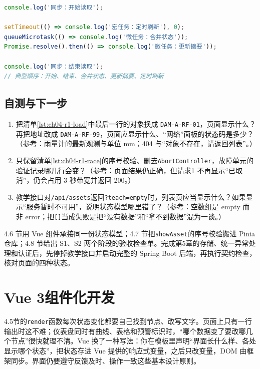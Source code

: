 \begin{lstlisting}[label={lst:ch04-a45-event-loop},language=JavaScript,caption={事件循环中的同步、微任务与宏任务}]
console.log('同步：开始读取');

setTimeout(() => console.log('宏任务：定时刷新'), 0);
queueMicrotask(() => console.log('微任务：合并状态'));
Promise.resolve().then(() => console.log('微任务：更新摘要'));

console.log('同步：结束读取');
// 典型顺序：开始、结束、合并状态、更新摘要、定时刷新
\end{lstlisting}

\subsection{自测与下一步}

\begin{enumerate}
\item 把清单\ref{lst:ch04-r1-load}中最后一行的对象换成 \texttt{DAM-A-RF-01}，页面显示什么？再把地址改成 \texttt{DAM-A-RF-99}，页面应显示什么、“网络”面板的状态码是多少？（参考：雨量计的最新观测与单位 mm；404 与“对象不存在，请返回列表”。）
\item 只保留清单\ref{lst:ch04-r1-race}的序号校验、删去\texttt{AbortController}，故障单元的验证记录哪几行会变？（参考：页面结果仍正确，但请求1 不再显示“已取消”，仍会占用 3 秒带宽并返回 200。）
\item 教学接口对\texttt{/api/assets}返回\texttt{?teach=empty}时，列表页应当显示什么？如果显示“服务暂时不可用”，说明状态模型哪里错了？（参考：空数组是 empty 而非 error；把\texttt{[]}当成失败是把“没有数据”和“拿不到数据”混为一谈。）
\end{enumerate}

4.6 节用 Vue 组件承接同一份状态模型；4.7 节把\texttt{showAsset}的序号校验搬进 Pinia 仓库；4.8 节给出 S1、S2 两个阶段的验收检查单。完成第5章的存储、统一异常处理和认证后，先停掉教学接口并启动完整的 Spring Boot 后端，再执行契约检查，核对页面的四种状态。

\section{Vue 3组件化开发}


4.5节的\texttt{render}函数每次状态变化都要自己找到节点、改写文字。页面上只有一行输出时这不难；仪表盘同时有曲线、表格和预警标识时，“哪个数据变了要改哪几个节点”很快就理不清。Vue 换了一种写法：你在模板里声明“界面长什么样、各处显示哪个状态”，把状态存进 Vue 提供的响应式变量，之后只改变量，DOM 由框架同步。界面仍要遵守反馈及时、操作一致这些基本设计原则\cite{norman2013}。

